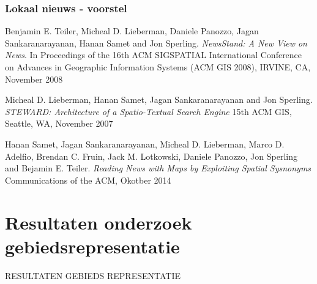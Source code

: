 \documentclass[twoside,openright]{uva-bachelor-thesis}
\begin{document}
		\subsection{Lokaal nieuws - voorstel}
	
\begin{thebibliography}{9}
	Benjamin E. Teiler, Micheal D. Lieberman, Daniele Panozzo, Jagan Sankaranarayanan, Hanan Samet and Jon Sperling.
	\textit{NewsStand: A New View on News}. 
	In Proceedings of the 16th ACM SIGSPATIAL International Conference on Advances in Geographic Information Systems (ACM GIS 2008), IRVINE, CA, November 2008
	
	Micheal D. Lieberman, Hanan Samet, Jagan Sankaranarayanan and Jon Sperling.
	\textit{STEWARD: Architecture of a Spatio-Textual Search Engine}
	15th ACM GIS, Seattle, WA, November 2007
	
	Hanan Samet, Jagan Sankaranarayanan, Micheal D. Lieberman, Marco D. Adelfio, Brendan C. Fruin, Jack M. Lotkowski, Daniele Panozzo, Jon Sperling and Bejamin E. Teiler.
	\textit{Reading News with Maps by Exploiting Spatial Sysnonyms}
	Communications of the ACM, Okotber 2014
\end{thebibliography}
\newpage
\appendix
\chapter{Resultaten onderzoek gebiedsrepresentatie}
\label{app:results_rep}
RESULTATEN GEBIEDS REPRESENTATIE
\end{document}
